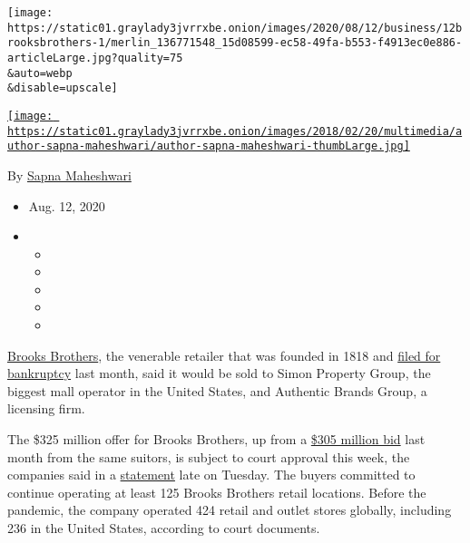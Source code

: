 \texttt{[image: https://static01.graylady3jvrrxbe.onion/images/2020/08/12/business/12brooksbrothers-1/merlin\_136771548\_15d08599-ec58-49fa-b553-f4913ec0e886-articleLarge.jpg?quality=75\\\&auto=webp\\\&disable=upscale]}

\href{https://www.nytimes3xbfgragh.onion/by/sapna-maheshwari}{\texttt{[image: https://static01.graylady3jvrrxbe.onion/images/2018/02/20/multimedia/author-sapna-maheshwari/author-sapna-maheshwari-thumbLarge.jpg]}}

By \href{https://www.nytimes3xbfgragh.onion/by/sapna-maheshwari}{Sapna
Maheshwari}

\begin{itemize}
\item
  Aug. 12, 2020
\item
  \begin{itemize}
  \item
  \item
  \item
  \item
  \item
  \end{itemize}
\end{itemize}

\href{https://www.nytimes3xbfgragh.onion/2020/06/05/business/brooks-brothers-factory-closings.html}{Brooks
Brothers}, the venerable retailer that was founded in 1818 and
\href{https://www.nytimes3xbfgragh.onion/2020/07/08/business/brooks-brothers-chapter-11-bankruptcy.html}{filed
for bankruptcy} last month, said it would be sold to Simon Property
Group, the biggest mall operator in the United States, and Authentic
Brands Group, a licensing firm.

The \$325 million offer for Brooks Brothers, up from a
\href{https://www.businesswire.com/news/home/20200723005977/en/Brooks-Brothers-Enters-305-Million-Stalking-Horse}{\$305
million bid} last month from the same suitors, is subject to court
approval this week, the companies said in a
\href{https://www.businesswire.com/news/home/20200811005866/en/Brooks-Brothers-Seek-Approval-Sale-Authentic-Brands}{statement}
late on Tuesday. The buyers committed to continue operating at least 125
Brooks Brothers retail locations. Before the pandemic, the company
operated 424 retail and outlet stores globally, including 236 in the
United States, according to court documents.

